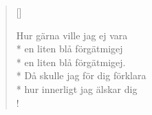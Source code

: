 
\settowidth{\versewidth}{en liten blå förgätmigej.}



\begin{verse}[\versewidth]

Hur gärna ville jag ej vara\\*
en liten blå förgätmigej\\*
en liten blå förgätmigej.\\*
Då skulle jag för dig förklara\\*
hur innerligt jag älskar dig\\!


\end{verse}

